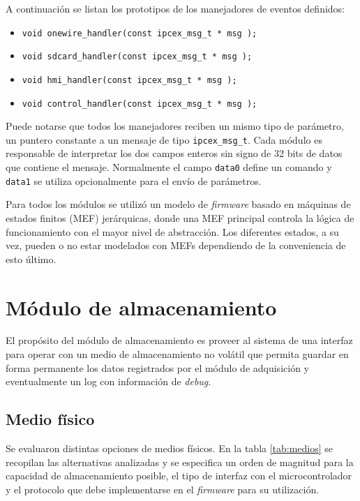 A continuación se listan los prototipos de los manejadores de eventos definidos:

\vspace{10px}

\begin{itemize}
  \item \texttt{void onewire\_handler(const ipcex\_msg\_t * msg );} 
  \item \texttt{void sdcard\_handler(const ipcex\_msg\_t * msg );} 
  \item \texttt{void hmi\_handler(const ipcex\_msg\_t * msg );} 
  \item \texttt{void control\_handler(const ipcex\_msg\_t * msg );} 
\end{itemize}

\vspace{10px}

Puede notarse que todos los manejadores reciben un mismo tipo de parámetro, un puntero constante a un mensaje de tipo \texttt{ipcex\_msg\_t}.  Cada módulo es responsable de interpretar los dos campos enteros sin signo de 32 bits de datos que contiene el mensaje.  Normalmente el campo \texttt{data0} define un comando y \texttt{data1} se utiliza opcionalmente para el envío de parámetros.

Para todos los módulos se utilizó un modelo de \textit{firmware} basado en máquinas de estados finitos (MEF) jerárquicas, donde una MEF principal controla la lógica de funcionamiento con el mayor nivel de abstracción. Los diferentes estados, a su vez, pueden o no estar modelados con MEFs dependiendo de la conveniencia de esto último.  

\section{Módulo de almacenamiento}
\label{sec:almacenamiento}

El propósito del módulo de almacenamiento es proveer al sistema de una interfaz para operar con un medio de almacenamiento no volátil que permita guardar en forma permanente los datos registrados por el módulo de adquisición y eventualmente un log con información de \textit{debug}.  

\subsection{Medio físico}
\label{subsec:mediofisico}

Se evaluaron distintas opciones de medios físicos.  En la tabla \ref{tab:medios} se recopilan las alternativas analizadas y se especifica un orden de magnitud para la capacidad de almacenamiento posible, el tipo de interfaz con el microcontrolador y el protocolo que debe implementarse en el \textit{firmware} para su utilización.

